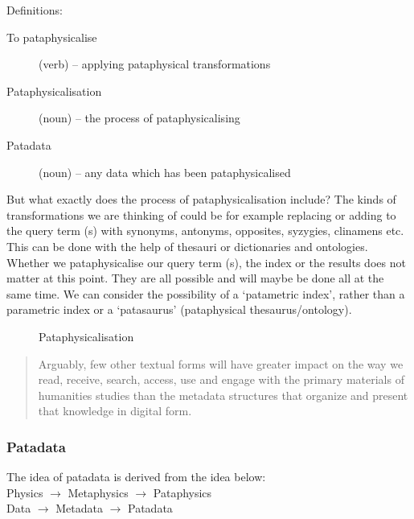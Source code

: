 Definitions:
\begin{description}
  \item [To pataphysicalise] (verb) – applying pataphysical transformations
  \item [Pataphysicalisation] (noun) – the process of pataphysicalising
  \item [Patadata] (noun) – any data which has been pataphysicalised
\end{description}

But what exactly does the process of pataphysicalisation include? The kinds of transformations we are thinking of could be for example replacing or adding to the query term (s) with synonyms, antonyms, opposites, syzygies, clinamens etc. This can be done with the help of thesauri or dictionaries and ontologies. Whether we pataphysicalise our query term (s), the index or the results does not matter at this point. They are all possible and will maybe be done all at the same time. We can consider the possibility of a `patametric index', rather than a parametric index or a `patasaurus' (pataphysical thesaurus/ontology).

\begin{figure}[!htbp] %
  \centering
  \def\svgwidth{\columnwidth}
  
\caption[Pataphysicalisation]{Pataphysicalisation}
\label{fig:patasearch02f}
\end{figure}

\begin{quotation}
  Arguably, few other textual forms will have greater impact on the way we read, receive, search, access, use and engage with the primary materials of humanities studies than the metadata structures that organize and present that knowledge in digital form. 
\end{quotation}


\subsubsection{Patadata}

The idea of patadata is derived from the idea below:\\
Physics $\to$ Metaphysics $\to$ Pataphysics\\
Data $\to$ Metadata $\to$ Patadata

